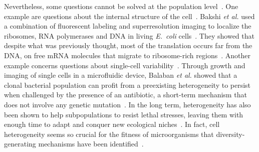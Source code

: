 Nevertheless, some questions cannot be solved at the population level~\cite{davey_flow_1996,bakshi_superresolution_2012,balaban_bacterial_2004}.
One example are questions about the internal structure of the cell~\cite{bakshi_superresolution_2012}.
Bakshi \textit{et al.} used a combination of fluorescent labeling and superresolution imaging to localize the ribosomes, RNA polymerases and DNA in living \textit{E.~coli} cells~\cite{bakshi_superresolution_2012}.
They showed that despite what was previously thought, most of the translation occurs far from the DNA, on free mRNA molecules that migrate to ribosome-rich regions~\cite{bakshi_superresolution_2012}.
Another example concerns questions about single-cell variability~\cite{balaban_bacterial_2004,booth_stress_2002,sumner_phenotypic_2002}.
Through growth and imaging of single cells in a microfluidic device, Balaban \textit{et al.} showed that a clonal bacterial population can profit from a preexisting heterogeneity to persist when challenged by the presence of an antibiotic, a short-term mechanism that does not involve any genetic mutation~\cite{balaban_bacterial_2004}.
In the long term, heterogeneity has also been shown to help subpopulations to resist lethal stresses, leaving them with enough time to adapt and conquer new ecological niches~\cite{booth_stress_2002,sumner_phenotypic_2002}.
In fact, cell heterogeneity seems so crucial for the fitness of microorganisms that diversity-generating mechanisms have been identified~\cite{true_yeast_2000,fraser_noise_2004,raser_control_2004}.

